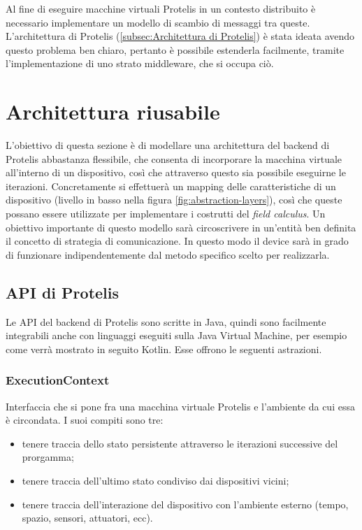 Al fine di eseguire macchine virtuali Protelis in un contesto distribuito è
necessario implementare un modello di scambio di messaggi tra queste.
L'architettura di Protelis (\ref{subsec:Architettura di Protelis}) è stata
ideata avendo questo problema ben chiaro, pertanto è possibile estenderla
facilmente, tramite l'implementazione di uno strato middleware, che si occupa
ciò.

%

\section{Architettura riusabile}
L'obiettivo di questa sezione è di modellare una architettura del backend di
Protelis abbastanza flessibile, che consenta di incorporare la macchina virtuale
all'interno di un dispositivo, così che attraverso questo sia possibile
eseguirne le iterazioni. Concretamente si effettuerà un mapping delle
caratteristiche di un dispositivo (livello in basso nella figura
\ref{fig:abstraction-layers}), così che queste possano essere utilizzate per
implementare i costrutti del \textit{field calculus}. Un obiettivo importante di
questo modello sarà circoscrivere in un'entità ben definita il concetto di
strategia di comunicazione. In questo modo il device sarà in grado di funzionare
indipendentemente dal metodo specifico scelto per realizzarla.

\subsection{API di Protelis}
Le API del backend di Protelis sono scritte in Java, quindi sono facilmente
integrabili anche con linguaggi eseguiti sulla Java Virtual Machine, per esempio
come verrà mostrato in seguito Kotlin. Esse offrono le seguenti astrazioni.

\subsubsection{ExecutionContext}
Interfaccia che si pone fra una macchina virtuale Protelis e l'ambiente da cui
essa è circondata. I suoi compiti sono tre:
\begin{itemize}
\item tenere traccia dello stato persistente attraverso le iterazioni successive
  del prorgamma;
\item tenere traccia dell'ultimo stato condiviso dai dispositivi vicini;
\item tenere traccia dell'interazione del dispositivo con l'ambiente esterno
  (tempo, spazio, sensori, attuatori, ecc).
\end{itemize}

